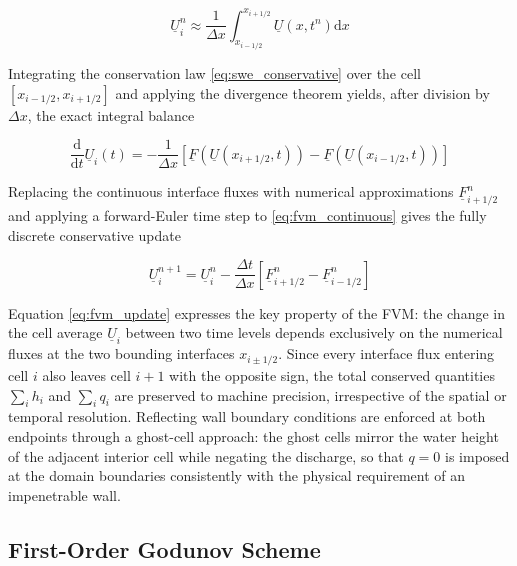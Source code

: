 \begin{equation}
\underline{U}_i^n \approx \frac{1}{\Delta x} \int_{x_{i-1/2}}^{x_{i+1/2}} \underline{U}(x, t^n)  \mathrm{d}x
\label{eq:cell_average}
\end{equation}


Integrating the conservation law \eqref{eq:swe_conservative} over the cell \( [x_{i-1/2}, x_{i+1/2}] \) and applying the divergence theorem yields, after division by \( \Delta x \), the exact integral balance

\begin{equation}
\frac{\mathrm{d}}{\mathrm{d}t} \underline{U}_i(t) = -\frac{1}{\Delta x} \left[\underline{F}\left(\underline{U}(x_{i+1/2}, t)\right) - \underline{F}\left(\underline{U}(x_{i-1/2}, t)\right)\right]
\label{eq:fvm_continuous}
\end{equation}

Replacing the continuous interface fluxes with numerical approximations \( \underline{F}_{i+1/2}^n \) and applying a forward-Euler time step to \eqref{eq:fvm_continuous} gives the fully discrete conservative update

\begin{equation}
\underline{U}_i^{n+1} = \underline{U}_i^n - \frac{\Delta t}{\Delta x} \left[\underline{F}_{i+1/2}^n - \underline{F}_{i-1/2}^n\right]
\label{eq:fvm_update}
\end{equation}

Equation \eqref{eq:fvm_update} expresses the key property of the FVM: the change in the cell average \( \underline{U}_i \) between two time levels depends exclusively on the numerical fluxes at the two bounding interfaces \( x_{i \pm 1/2} \). Since every interface flux entering cell \( i \) also leaves cell \( i+1 \) with the opposite sign, the total conserved quantities \( \sum_i h_i \) and \( \sum_i q_i \) are preserved to machine precision, irrespective of the spatial or temporal resolution.
Reflecting wall boundary conditions are enforced at both endpoints through a ghost-cell approach: the ghost cells mirror the water height of the adjacent interior cell while negating the discharge, so that \( q = 0 \) is imposed at the domain boundaries consistently with the physical requirement of an impenetrable wall.

\subsection{First-Order Godunov Scheme}
\label{ssc:313}

